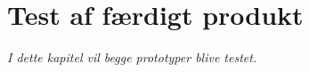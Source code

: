 \chapter{Test af færdigt produkt}\label{kap:tests}

\emph{I dette kapitel vil begge prototyper blive testet.}